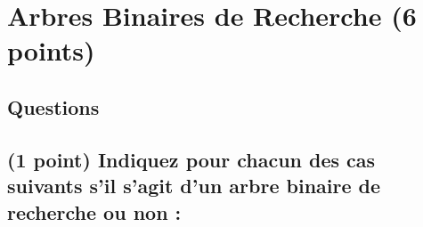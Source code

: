 \documentclass[11pt,a4paper]{article}
\begin{document}
\clearpage


\section{Arbres Binaires de Recherche (6 points)}

\subsection*{Questions}


\subsection{(1 point) Indiquez pour chacun des cas suivants s'il s'agit d'un arbre binaire de recherche ou non : }
\end{document}
